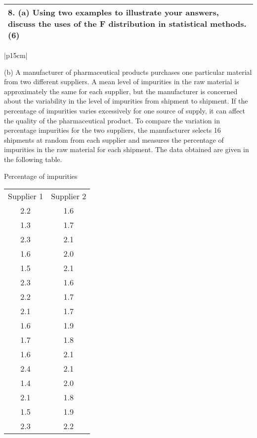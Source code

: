 \documentclass[a4paper,12pt]{article}
\begin{document}
  \begin{table}[ht!]
     \centering
     \begin{tabular}{|p{15cm}|}
     \hline        
8. (a) Using two examples to illustrate your answers, discuss the uses of the F distribution in statistical methods. (6) 
\\ \hline
      \end{tabular}
    \end{table}
    
\begin{table}[ht!]
 
\centering
 
\begin{tabular}{|p{15cm}|}
 
\hline  


 
 (b) A manufacturer of pharmaceutical products purchases one particular material from two different suppliers.  A mean level of impurities in the raw material is approximately the same for each supplier, but the manufacturer is concerned about the variability in the level of impurities from shipment to shipment.  If the percentage of impurities varies excessively for one source of supply, it can affect the quality of the pharmaceutical product.  To compare the variation in percentage impurities for the two suppliers, the manufacturer selects 16 shipments at random from each supplier and measures the percentage of impurities in the raw material for each shipment.  The data obtained are given in the following table. 

\newpage 
 
    Percentage of impurities 
\begin{tabular}{c|c}
 
Supplier 1 &  Supplier 2 \\
2.2 & 1.6 \\
1.3 & 1.7 \\
2.3 & 2.1 \\
1.6 & 2.0 \\
1.5 & 2.1 \\
2.3 & 1.6 \\
2.2 & 1.7 \\
2.1 & 1.7 \\
1.6 & 1.9 \\
1.7 & 1.8 \\
1.6 & 2.1 \\
2.4 & 2.1 \\
1.4 & 2.0 \\
2.1 & 1.8 \\
1.5 & 1.9 \\
2.3 & 2.2 \\
\end{tabular}
 

\end{tabular}
\end{table}
\end{document}
